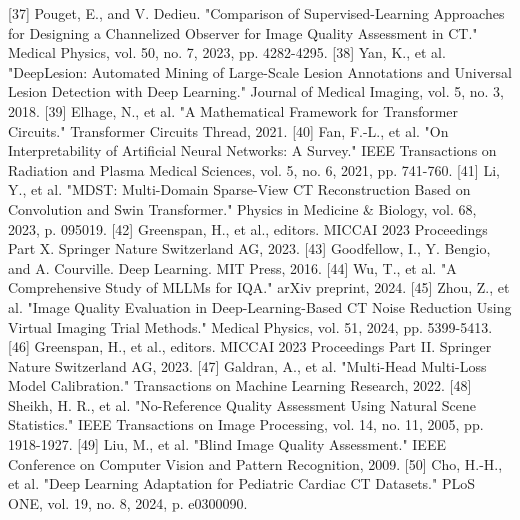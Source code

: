 [37] Pouget, E., and V. Dedieu. "Comparison of Supervised-Learning Approaches for Designing a Channelized Observer for Image Quality Assessment in CT." Medical Physics, vol. 50, no. 7, 2023, pp. 4282-4295.
[38] Yan, K., et al. "DeepLesion: Automated Mining of Large-Scale Lesion Annotations and Universal Lesion Detection with Deep Learning." Journal of Medical Imaging, vol. 5, no. 3, 2018.
[39] Elhage, N., et al. "A Mathematical Framework for Transformer Circuits." Transformer Circuits Thread, 2021.
[40] Fan, F.-L., et al. "On Interpretability of Artificial Neural Networks: A Survey." IEEE Transactions on Radiation and Plasma Medical Sciences, vol. 5, no. 6, 2021, pp. 741-760.
[41] Li, Y., et al. "MDST: Multi-Domain Sparse-View CT Reconstruction Based on Convolution and Swin Transformer." Physics in Medicine & Biology, vol. 68, 2023, p. 095019.
[42] Greenspan, H., et al., editors. MICCAI 2023 Proceedings Part X. Springer Nature Switzerland AG, 2023.
[43] Goodfellow, I., Y. Bengio, and A. Courville. Deep Learning. MIT Press, 2016.
[44] Wu, T., et al. "A Comprehensive Study of MLLMs for IQA." arXiv preprint, 2024.
[45] Zhou, Z., et al. "Image Quality Evaluation in Deep-Learning-Based CT Noise Reduction Using Virtual Imaging Trial Methods." Medical Physics, vol. 51, 2024, pp. 5399-5413.
[46] Greenspan, H., et al., editors. MICCAI 2023 Proceedings Part II. Springer Nature Switzerland AG, 2023.
[47] Galdran, A., et al. "Multi-Head Multi-Loss Model Calibration." Transactions on Machine Learning Research, 2022.
[48] Sheikh, H. R., et al. "No-Reference Quality Assessment Using Natural Scene Statistics." IEEE Transactions on Image Processing, vol. 14, no. 11, 2005, pp. 1918-1927.
[49] Liu, M., et al. "Blind Image Quality Assessment." IEEE Conference on Computer Vision and Pattern Recognition, 2009.
[50] Cho, H.-H., et al. "Deep Learning Adaptation for Pediatric Cardiac CT Datasets." PLoS ONE, vol. 19, no. 8, 2024, p. e0300090.
